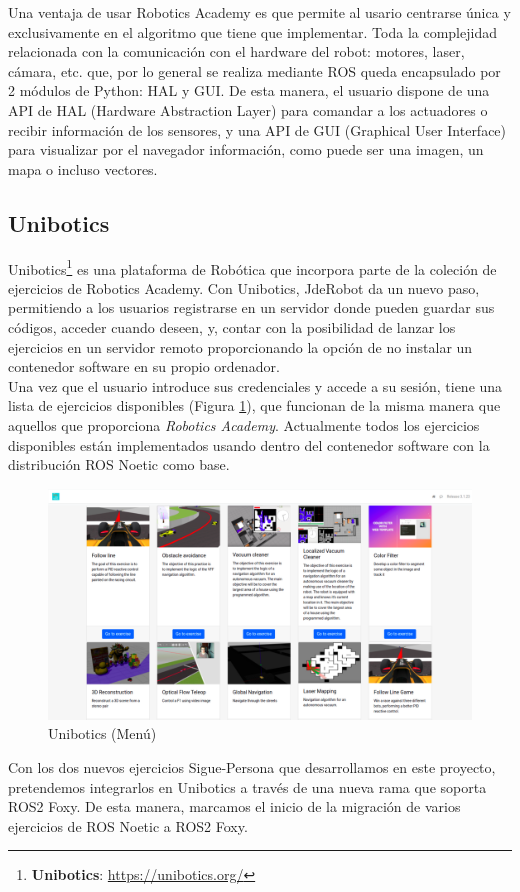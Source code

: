 Una ventaja de usar Robotics Academy es que permite al usario centrarse única y exclusivamente en el algoritmo que tiene que implementar. Toda la complejidad relacionada con la comunicación con el hardware del robot: motores, laser, cámara, etc. que, por lo general se realiza mediante ROS queda encapsulado por 2 módulos de Python: HAL y GUI. De esta manera, el usuario dispone de una API de HAL (Hardware Abstraction Layer) para comandar a los actuadores o recibir información de los sensores, y una API de GUI (Graphical User Interface) para visualizar por el navegador información, como puede ser una imagen, un mapa o incluso vectores.\\

\subsection{Unibotics}
\label{subsec:unibotics}

Unibotics\footnote{\textbf{Unibotics}: \url{https://unibotics.org/}} es una plataforma de Robótica que incorpora parte de la coleción de ejercicios de Robotics Academy. Con Unibotics, JdeRobot da un nuevo paso, permitiendo a los usuarios registrarse en un servidor donde pueden guardar sus códigos, acceder cuando deseen, y, contar con la posibilidad de lanzar los ejercicios en un servidor remoto proporcionando la opción de no instalar un contenedor software en su propio ordenador.\\

Una vez que el usuario introduce sus credenciales y accede a su sesión, tiene una lista de ejercicios disponibles (Figura \ref{fig:menu-unibotics}), que funcionan de la misma manera que aquellos que proporciona \textit{Robotics Academy}. Actualmente todos los ejercicios disponibles están implementados usando dentro del contenedor software con la distribución ROS Noetic como base.\\

\begin{figure} [H]
  \begin{center}
    \includegraphics[width=12cm]{imagenes/cap1/unibotics-menu.png}
  \end{center}
  \caption[Unibotics (Menú)]{Unibotics (Menú)}
  \label{fig:menu-unibotics}
\end{figure}

Con los dos nuevos ejercicios Sigue-Persona que desarrollamos en este proyecto, pretendemos integrarlos en Unibotics a través de una nueva rama que soporta ROS2 Foxy. De esta manera, marcamos el inicio de la migración de varios ejercicios de ROS Noetic a ROS2 Foxy.\\




